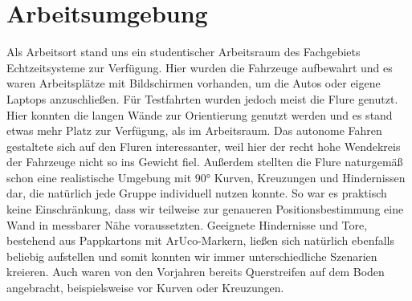 \section{Arbeitsumgebung}
\label{sec:arbeitsumgebung}
Als Arbeitsort stand uns ein studentischer Arbeitsraum des Fachgebiets Echtzeitsysteme zur Verfügung. Hier wurden die Fahrzeuge aufbewahrt und es waren Arbeitsplätze mit Bildschirmen vorhanden, um die Autos oder eigene Laptops anzuschließen. 
\newline
Für Testfahrten wurden jedoch meist die Flure genutzt. Hier konnten die langen Wände zur Orientierung genutzt werden und es stand etwas mehr Platz zur Verfügung, als im Arbeitsraum. Das autonome Fahren gestaltete sich auf den Fluren interessanter, weil hier der recht hohe Wendekreis der Fahrzeuge nicht so ins Gewicht fiel. Außerdem stellten die Flure naturgemäß schon eine realistische Umgebung mit 90° Kurven, Kreuzungen und Hindernissen dar, die natürlich jede Gruppe individuell nutzen konnte. So war es praktisch keine Einschränkung, dass wir teilweise zur genaueren Positionsbestimmung eine Wand in messbarer Nähe voraussetzten. Geeignete Hindernisse und Tore, bestehend aus Pappkartons mit ArUco-Markern, ließen sich natürlich ebenfalls beliebig aufstellen und somit konnten wir immer unterschiedliche Szenarien kreieren. Auch waren von den Vorjahren bereits Querstreifen auf dem Boden angebracht, beispielsweise vor Kurven oder Kreuzungen.
